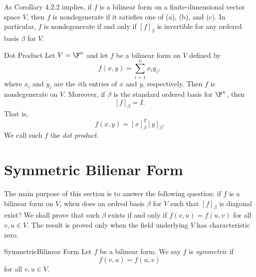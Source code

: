 \documentclass[linearalgebraII]{subfiles}
\begin{document}
    \begin{remark}
        As Corollary 4.2.2 implies, if $f$ is a bilinear form on a finite-dimensional vector space $V$, then $f$ is nondegenerate if it satisfies one of (a), (b), and (c). In particular, $f$ is nondegenerate if and only if $\left[ f \right] _\beta$ is invertible for any ordered basis $\beta$ for $V$.
    \end{remark}

    \begin{definition}{Dot Product}{}
        Let $V = \F^n$ and let $f$ be a bilinear form on $V$ defined by
        \begin{equation*}
            f\left( x,y \right) = \sum^{n}_{i=1} x_iy_i,
        \end{equation*}
        where $x_i$ and $y_i$ are the $i$th entries of $x$ and $y$, respectively. Then $f$ is nondegenerate on $V$. Moreover, if $\beta$ is the standard ordered basis for $\F^n$, then
        \begin{equation*}
            \left[ f \right] _\beta = I.
        \end{equation*}
        That is,
        \begin{equation*}
            f\left( x,y \right) = \left[ x \right] _\beta^T \left[ y \right] _\beta.
        \end{equation*}
        We call such $f$ the \emph{dot product}.
    \end{definition}

    \section{Symmetric Bilienar Form}
    
    \begin{remark}
        The main purpose of this section is to answer the following question: if $f$ is a bilinear form on $V$, when does an ordred basis $\beta$ for $V$ such that $[f]_\beta$ is diagonal exist? We shall prove that such $\beta$ exists if and only if $f\left( v,u \right) = f\left( u,v \right)$ for all $v,u\in V$.  The result is proved only when the field underlying $V$ has characteristic zero.
    \end{remark}

    \begin{definition}{Symmetric}{Bilinear Form}
        Let $f$ be a bilinear form. We say $f$ is \emph{symmetric} if
        \begin{equation*}
            f\left( v,u \right) = f\left( u,v \right) 
        \end{equation*}
        for all $v,u\in V$.
    \end{definition}
\end{document}
